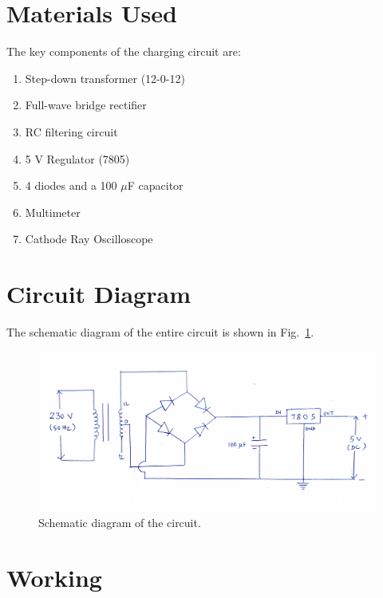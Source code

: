 \documentclass[journal,12pt,twocolumn]{IEEEtran}
\begin{document}
\section{Materials Used}
The key components of the charging circuit are:
\begin{enumerate}
    \item Step-down transformer (12-0-12)
    \item Full-wave bridge rectifier
    \item RC filtering circuit
    \item 5 V Regulator (7805)
    \item 4 diodes and a 100 \( \mu \)F capacitor
    \item Multimeter
    \item Cathode Ray Oscilloscope
\end{enumerate}

\section{Circuit Diagram}
The schematic diagram of the entire circuit is shown in Fig.~\ref{fig:ckt}.
\begin{figure}[!htb]
    \includegraphics[width=\columnwidth]{figs/circuit}
    \caption{Schematic diagram of the circuit.}
    \label{fig:ckt}
\end{figure}

\section{Working}
\end{document}
